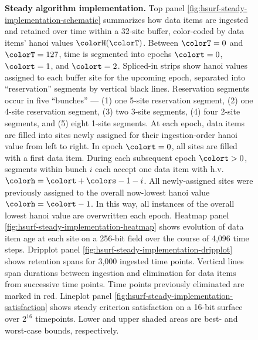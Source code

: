 \begin{figure}[htbp!]
\vspace{-2ex}\caption{%
  \textbf{Steady algorithm implementation.}
  \footnotesize
  Top panel \ref{fig:hsurf-steady-implementation-schematic} summarizes how data items are ingested and retained over time within a 32-site buffer, color-coded by data items' hanoi values $\colorH(\colorT)$.
  Between $\colorT=0$ and $\colorT=127$, time is segmented into epochs $\colort=0$, $\colort=1$, and $\colort=2$.
  Spliced-in strips show hanoi values assigned to each buffer site for the upcoming epoch, separated into ``reservation'' segments by vertical black lines.
  Reservation segments occur in five ``bunches'' --- (1) one 5-site reservation segment, (2) one 4-site reservation segment, (3) two 3-site segments, (4) four 2-site segments, and (5) eight 1-site segments.
  At each epoch, data items are filled into sites newly assigned for their ingestion-order hanoi value from left to right.
  In epoch $\colort=0$, all sites are filled with a first data item.
  During each subsequent epoch $\colort>0$, segments within bunch $i$ each accept one data item with h.v. $\colorh=\colort + \colors - 1 - i$.
  All newly-assigned sites were previously assigned to the overall now-lowest hanoi value $\colorh=\colort - 1$.
  In this way, all instances of the overall lowest hanoi value are overwritten each epoch.
  Heatmap panel \ref{fig:hsurf-steady-implementation-heatmap} shows evolution of data item age at each site on a 256-bit field over the course of 4,096 time steps.
  Dripplot panel \ref{fig:hsurf-steady-implementation-dripplot} shows retention spans for 3,000 ingested time points.
  Vertical lines span durations between ingestion and elimination for data items from successive time points.
  Time points previously eliminated are marked in red.
  Lineplot panel \ref{fig:hsurf-steady-implementation-satisfaction} shows steady criterion satisfaction on a 16-bit surface over $2^{16}$ timepoints.
  Lower and upper shaded areas are best- and worst-case bounds, respectively.
  }
\label{fig:hsurf-steady-implementation}

\end{figure}
